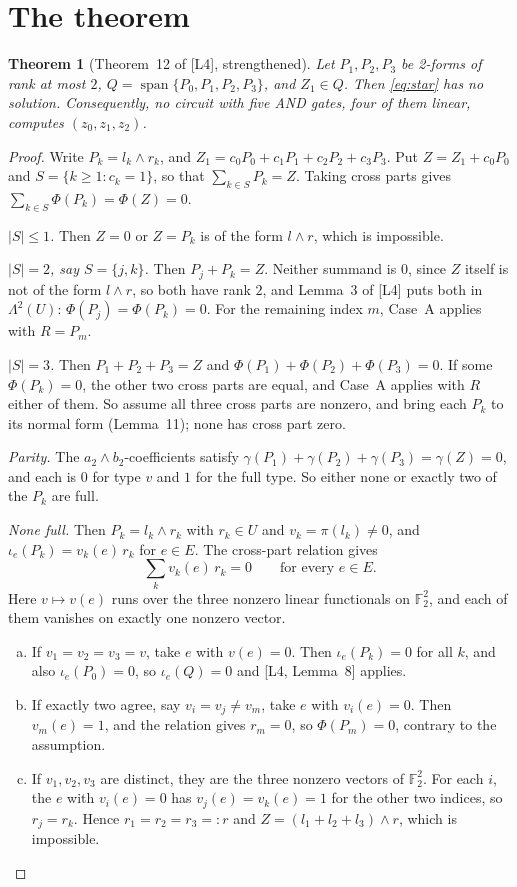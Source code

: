 \documentclass[11pt,a4paper]{article}
\theoremstyle{plain}
\newtheorem{theorem}{Theorem}
\theoremstyle{definition}
\theoremstyle{remark}
\newcommand{\F}{\mathbb{F}_2}
\newcommand{\Span}{\operatorname{span}}
\newcommand{\Lam}{\Lambda^{2}}
\newcommand{\Dir}{E}
\begin{document}
\section{The theorem}

\begin{theorem}[Theorem~12 of {[L4]}, strengthened]\label{thm:main}
Let $P_1,P_2,P_3$ be 2-forms of rank at most $2$, $Q=\Span\{P_0,P_1,P_2,P_3\}$, and $Z_1\in Q$. Then \eqref{eq:star} has no solution. Consequently, no circuit with five AND gates, four of them linear, computes $(z_0,z_1,z_2)$.
\end{theorem}

\begin{proof}
Write $P_k=l_k\wedge r_k$, and $Z_1=c_0P_0+c_1P_1+c_2P_2+c_3P_3$. Put $Z=Z_1+c_0P_0$ and $S=\{k\ge1:c_k=1\}$, so that $\sum_{k\in S}P_k=Z$. Taking cross parts gives $\sum_{k\in S}\Phi(P_k)=\Phi(Z)=0$.

\medskip\noindent\emph{$|S|\le1$.} Then $Z=0$ or $Z=P_k$ is of the form $l\wedge r$, which is impossible.

\medskip\noindent\emph{$|S|=2$, say $S=\{j,k\}$.} Then $P_j+P_k=Z$. Neither summand is $0$, since $Z$ itself is not of the form $l\wedge r$, so both have rank $2$, and Lemma~3 of [L4] puts both in $\Lam(U)$: $\Phi(P_j)=\Phi(P_k)=0$. For the remaining index $m$, Case~A applies with $R=P_m$.

\medskip\noindent\emph{$|S|=3$.} Then $P_1+P_2+P_3=Z$ and $\Phi(P_1)+\Phi(P_2)+\Phi(P_3)=0$. If some $\Phi(P_k)=0$, the other two cross parts are equal, and Case~A applies with $R$ either of them. So assume all three cross parts are nonzero, and bring each $P_k$ to its normal form (Lemma~11); none has cross part zero.

\emph{Parity.} The $a_2\wedge b_2$-coefficients satisfy $\gamma(P_1)+\gamma(P_2)+\gamma(P_3)=\gamma(Z)=0$, and each is $0$ for type $v$ and $1$ for the full type. So either none or exactly two of the $P_k$ are full.

\emph{None full.} Then $P_k=l_k\wedge r_k$ with $r_k\in U$ and $v_k=\pi(l_k)\ne0$, and $\iota_e(P_k)=v_k(e)\,r_k$ for $e\in\Dir$. The cross-part relation gives
\[
  \textstyle\sum_k v_k(e)\,r_k=0\qquad\text{for every }e\in\Dir .
\]
Here $v\mapsto v(e)$ runs over the three nonzero linear functionals on $\F^2$, and each of them vanishes on exactly one nonzero vector.
\begin{enumerate}[(a)]
  \item If $v_1=v_2=v_3=v$, take $e$ with $v(e)=0$. Then $\iota_e(P_k)=0$ for all $k$, and also $\iota_e(P_0)=0$, so $\iota_e(Q)=0$ and [L4, Lemma~8] applies.
  \item If exactly two agree, say $v_i=v_j\ne v_m$, take $e$ with $v_i(e)=0$. Then $v_m(e)=1$, and the relation gives $r_m=0$, so $\Phi(P_m)=0$, contrary to the assumption.
  \item If $v_1,v_2,v_3$ are distinct, they are the three nonzero vectors of $\F^2$. For each $i$, the $e$ with $v_i(e)=0$ has $v_j(e)=v_k(e)=1$ for the other two indices, so $r_j=r_k$. Hence $r_1=r_2=r_3=:r$ and $Z=(l_1+l_2+l_3)\wedge r$, which is impossible.
\end{enumerate}


\end{proof}
\end{document}
